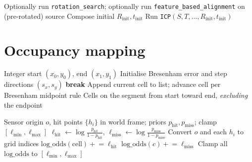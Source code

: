 \documentclass[11pt,a4paper]{article}
\begin{document}
\begin{algorithm}
\caption{Scan pair: optional pre-alignment + ICP (\texttt{\_run\_icp\_pair})}
\begin{algorithmic}[1]
    \State Optionally run \texttt{rotation\_search}; optionally run \texttt{feature\_based\_alignment} on (pre-rotated) source
    \State Compose initial $R_{\mathrm{init}}, t_{\mathrm{init}}$
\EndIf
\State Run \texttt{ICP}$(S, T, \ldots, R_{\mathrm{init}}, t_{\mathrm{init}})$
\end{algorithmic}
\end{algorithm}

\section{Occupancy mapping}

\begin{algorithm}
\caption{Bresenham line on the integer grid (\texttt{\_bresenham})}
\begin{algorithmic}[1]
\Require Integer start $(x_0,y_0)$, end $(x_1,y_1)$
\State Initialise Bresenham error and step directions $(s_x,s_y)$
     \textbf{break} \EndIf
    \State Append current cell to list; advance cell per Bresenham midpoint rule
\EndWhile
\Ensure Cells on the segment from start toward end, \emph{excluding} the endpoint
\end{algorithmic}
\end{algorithm}

\begin{algorithm}
\caption{Log-odds occupancy update for one scan (\texttt{OccupancyGrid2D.update\_scan})}
\begin{algorithmic}[1]
\Require Sensor origin $o$, hit points $\{h_i\}$ in world frame; priors $p_{\mathrm{hit}}, p_{\mathrm{miss}}$; clamp $[\ell_{\min},\ell_{\max}]$
\State $\ell_{\mathrm{hit}} \gets \log\frac{p_{\mathrm{hit}}}{1-p_{\mathrm{hit}}}$, \quad $\ell_{\mathrm{miss}} \gets \log\frac{p_{\mathrm{miss}}}{1-p_{\mathrm{miss}}}$
\State Convert $o$ and each $h_i$ to grid indices
    \State $\mathrm{log\_odds}(\text{cell}) \mathrel{+}= \ell_{\mathrm{hit}}$
\EndFor
{}
        \State $\mathrm{log\_odds}(c) \mathrel{+}= \ell_{\mathrm{miss}}$
    \EndFor
\EndFor
\State Clamp all $\mathrm{log\_odds}$ to $[\ell_{\min}, \ell_{\max}]$
\end{algorithmic}
\end{algorithm}
\end{document}
